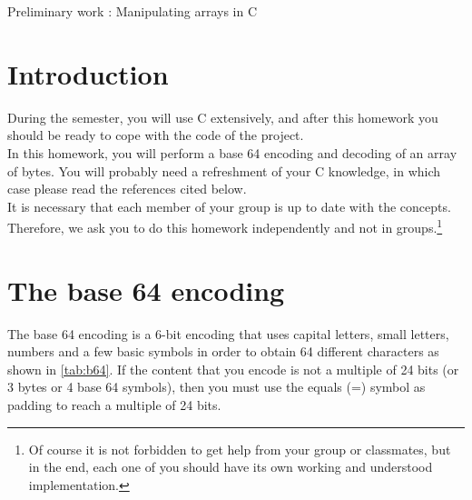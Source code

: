 \documentclass[a4paper,11pt]{article}
\begin{document}
\renewcommand{\figurename}{Fig.}

\renewcommand{\thepage}{\arabic{page}}
\setcounter{page}{1}
\pagestyle{main}
\newpage \clearpage

\begin{center}
\begin{huge}
Preliminary work : Manipulating arrays in C\\
\end{huge}
\vspace{0.3cm}
\end{center}
\section{Introduction}
During the semester, you will use C extensively, and after this homework you should be ready to cope with the code of the project.\\

In this homework, you will perform a base 64 encoding and decoding of an array of bytes. You will probably need a refreshment of your C knowledge, in which case please read the references cited below.\\
It is necessary that each member of your group is up to date with the concepts. Therefore, we ask you to do this homework independently and not in groups.\footnote{Of course it is not forbidden to get help from your group or classmates, but in the end, each one of you should have its own working and understood implementation.}\\
\section{The base 64 encoding}
The base 64 encoding is a 6-bit encoding that uses capital letters, small letters, numbers and a few basic symbols in order to obtain 64 different characters as shown in \autoref{tab:b64}. If the content that you encode is not a multiple of 24 bits (or 3 bytes or 4 base 64 symbols), then you must use the equals (=) symbol as padding to reach a multiple of 24 bits.
\end{document}
